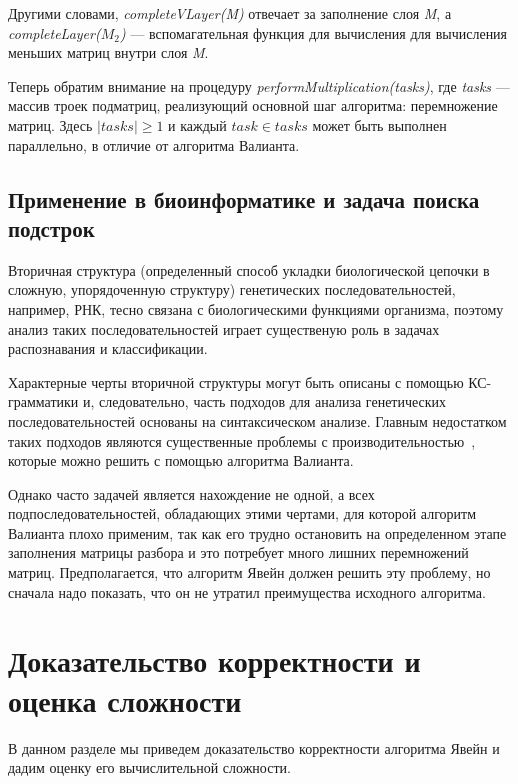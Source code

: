 \documentclass[14pt]{matmex-diploma-custom}
\begin{document}
Другими словами, \textit{completeVLayer(M)} отвечает за заполнение слоя \textit{M}, а \textit{completeLayer($M_{2}$)} --- вспомагательная функция для вычисления для вычисления меньших матриц внутри слоя \textit{M}.

Теперь обратим внимание на процедуру \textit{performMultiplication(tasks)}, где \textit{tasks} --- массив троек подматриц, реализующий основной шаг алгоритма: перемножение матриц.
Здесь $|tasks| \ge 1$ и каждый $task \in tasks$ может быть выполнен параллельно, в отличие от алгоритма Валианта.

\subsection{Применение в биоинформатике и задача поиска подстрок}

Вторичная структура (определенный способ укладки биологической цепочки в сложную, упорядоченную структуру) генетических последовательностей, например, РНК, тесно связана с биологическими функциями организма, поэтому анализ таких последовательностей играет существеную роль в задачах распознавания и классификации.

Характерные черты вторичной структуры могут быть описаны с помощью КС-грамматики и, следовательно, часть подходов для анализа генетических последовательностей основаны на синтаксическом анализе. Главным недостатком таких подходов являются существенные проблемы с производительностью~\cite{durbin1996biological}, которые можно решить с помощью алгоритма Валианта.

Однако часто задачей является нахождение не одной, а всех подпоследовательностей, обладающих этими чертами, для которой алгоритм Валианта плохо применим,  так как его трудно остановить на определенном этапе заполнения матрицы разбора и это потребует много лишних перемножений матриц. 
Предполагается, что алгоритм Явейн должен решить эту проблему, но сначала надо показать, что он не утратил преимущества исходного алгоритма.

\section{Доказательство корректности и оценка сложности}

В данном разделе мы приведем доказательство корректности алгоритма Явейн и дадим оценку его вычислительной сложности.
\end{document}
